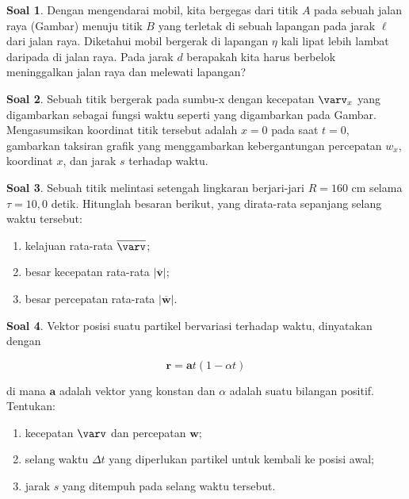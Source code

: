 \documentclass[a4paper, 11.5pt]{article}
\theoremstyle{definition}
\newtheorem{soal}{Soal}
\begin{document}
\begin{soal}
	Dengan mengendarai mobil, kita bergegas dari titik $A$ pada sebuah jalan raya (Gambar) menuju titik $B$ yang terletak di sebuah lapangan pada jarak $\ell$ dari jalan raya. Diketahui mobil bergerak di lapangan $\eta$ kali lipat lebih lambat daripada di jalan raya. Pada jarak $d$ berapakah kita harus berbelok meninggalkan jalan raya dan melewati lapangan?
\end{soal}

\begin{soal}
	Sebuah titik bergerak pada sumbu-x dengan kecepatan $\varv_x$ yang digambarkan sebagai fungsi waktu seperti yang digambarkan pada Gambar.\\
	Mengasumsikan koordinat titik tersebut adalah $x = 0$ pada saat $t = 0$, gambarkan taksiran grafik yang menggambarkan kebergantungan percepatan $w_x$, koordinat $x$, dan jarak $s$ terhadap waktu.
\end{soal}

\begin{soal}
	Sebuah titik melintasi setengah lingkaran berjari-jari $R = 160$ cm selama $\tau = 10{,}0$ detik. Hitunglah besaran berikut, yang dirata-rata sepanjang selang waktu tersebut:
	
	\begin{enumerate}[label=(\alph*)]
		\item kelajuan rata-rata $\overline{\varv}$;
		\item besar kecepatan rata-rata $|\overline{\boldsymbol{v}}|$;
		\item besar percepatan rata-rata $|\overline{\boldsymbol{w}}|$.
	\end{enumerate}
\end{soal}

\begin{soal}
	Vektor posisi suatu partikel bervariasi terhadap waktu, dinyatakan dengan
	
	\begin{equation*}
		\boldsymbol{r} = \boldsymbol{a}t(1 - \alpha t)
	\end{equation*}

	di mana $\boldsymbol{a}$ adalah vektor yang konstan dan $\alpha$ adalah suatu bilangan positif. Tentukan:
	\begin{enumerate}[label=(\alph*)]
		\item kecepatan $\boldsymbol{\varv}$ dan percepatan $\boldsymbol{w}$;
		\item selang waktu $\Delta t$ yang diperlukan partikel untuk kembali ke posisi awal;
		\item jarak $s$ yang ditempuh pada selang waktu tersebut.
	\end{enumerate}
\end{soal}
\end{document}
